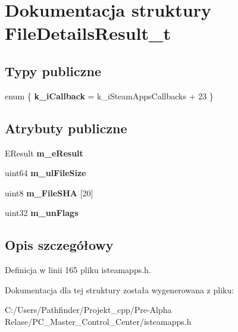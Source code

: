 \hypertarget{struct_file_details_result__t}{}\section{Dokumentacja struktury File\+Details\+Result\+\_\+t}
\label{struct_file_details_result__t}
\subsection*{Typy publiczne}
\begin{DoxyCompactItemize}
\item 
\mbox{\label{struct_file_details_result__t_a626564da62b41ce007cae38d50bea57e}} 
enum \{ {\bfseries k\+\_\+i\+Callback} = k\+\_\+i\+Steam\+Apps\+Callbacks + 23
 \}
\end{DoxyCompactItemize}
\subsection*{Atrybuty publiczne}
\begin{DoxyCompactItemize}
\item 
\mbox{\label{struct_file_details_result__t_a3f577ae075d55334ddf129d992c2292f}} 
E\+Result {\bfseries m\+\_\+e\+Result}
\item 
\mbox{\label{struct_file_details_result__t_aab35c3ca37713a65ddcd4faacc3bc2bb}} 
uint64 {\bfseries m\+\_\+ul\+File\+Size}
\item 
\mbox{\label{struct_file_details_result__t_a301f1cac922506bfb9fc3241442a0cd9}} 
uint8 {\bfseries m\+\_\+\+File\+S\+HA} \mbox{[}20\mbox{]}
\item 
\mbox{\label{struct_file_details_result__t_a1ddb6f5283bef847477703043167b99f}} 
uint32 {\bfseries m\+\_\+un\+Flags}
\end{DoxyCompactItemize}


\subsection{Opis szczegółowy}


Definicja w linii 165 pliku isteamapps.\+h.



Dokumentacja dla tej struktury została wygenerowana z pliku\+:\begin{DoxyCompactItemize}
\item 
C\+:/\+Users/\+Pathfinder/\+Projekt\+\_\+cpp/\+Pre-\/\+Alpha Relase/\+P\+C\+\_\+\+Master\+\_\+\+Control\+\_\+\+Center/isteamapps.\+h\end{DoxyCompactItemize}
